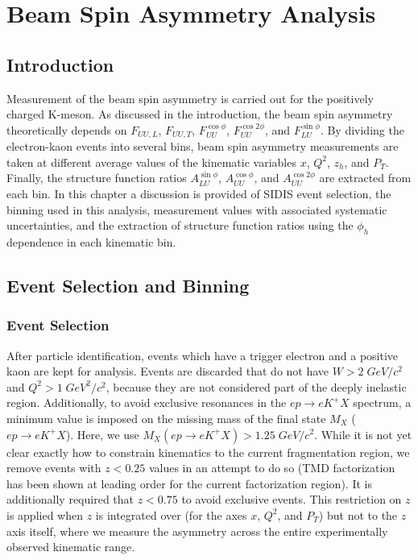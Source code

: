 \chapter{Beam Spin Asymmetry Analysis}

\section{Introduction}
Measurement of the beam spin asymmetry is carried out for the positively charged K-meson.  As discussed in the introduction, the beam spin asymmetry theoretically depends on $F_{UU,L}$, $F_{UU,T}$, $F_{UU}^{\cos\phi}$, $F_{UU}^{\cos 2\phi}$, and $F_{LU}^{\sin\phi}$.  By dividing the electron-kaon events into several bins, beam spin asymmetry measurements are taken at different average values of the kinematic variables $x$, $Q^2$, $z_h$, and $P_T$.  Finally, the structure function ratios $A_{LU}^{\sin\phi}$, $A_{UU}^{\cos\phi}$, and $A_{UU}^{\cos 2\phi}$ are extracted from each bin.  In this chapter a discussion is provided of SIDIS event selection, the binning used in this analysis, measurement values with associated systematic uncertainties, and the extraction of structure function ratios using the $\phi_h$ dependence in each kinematic bin.

\section{Event Selection and Binning}
\subsection{Event Selection}
After particle identification, events which have a trigger electron and a positive kaon are kept for analysis.  Events are discarded that do not have $W > 2 \; GeV/c^2$ and $Q^2 > 1 \; GeV^2/c^2$, because they are not considered part of the deeply inelastic region.  Additionally, to avoid exclusive resonances in the $ep \rightarrow eK^+X$ spectrum, a minimum value is imposed on the missing mass of the final state $M_X$ ($ep \rightarrow eK^+X$).  Here, we use $M_{X} (ep \rightarrow eK^+X) > 1.25 \; GeV/c^2$.  While it is not yet clear exactly how to constrain kinematics to the current fragmentation region, we remove events with $z < 0.25$ values in an attempt to do so (TMD factorization has been shown at leading order for the current factorization region).  It is additionally required that $z < 0.75$ to avoid exclusive events.  This restriction on $z$ is applied when $z$ is integrated over (for the axes $x$, $Q^2$, and $P_T$) but not to the $z$ axis itself, where we measure the asymmetry across the entire experimentally observed kinematic range.  

